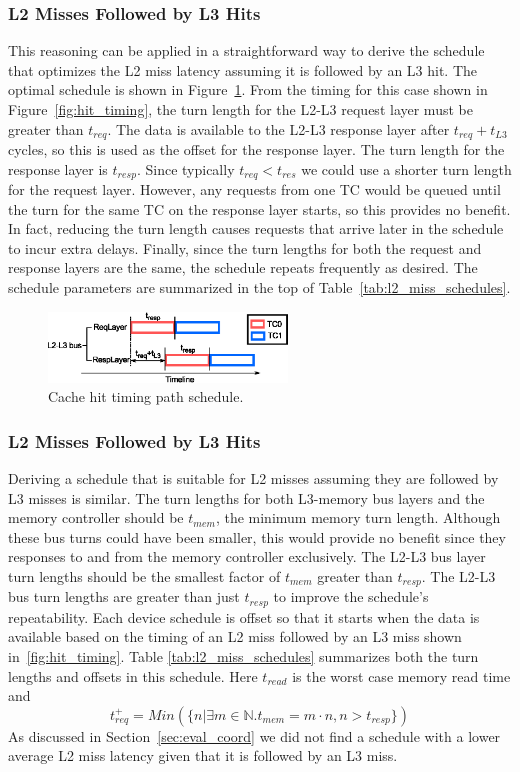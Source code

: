 \subsubsection{L2 Misses Followed by L3 Hits}
This reasoning can be applied in a straightforward way to derive the schedule 
that optimizes the L2 miss latency assuming it is followed by an L3 hit.
The optimal schedule is shown in Figure~\ref{fig:hit_schedule}.
From the timing for this case shown in Figure~\ref{fig:hit_timing}, the turn
length for the L2-L3 request layer must be greater than $t_{req}$. The 
data is available to the L2-L3 response layer after $t_{req}+t_{L3}$ cycles, so 
this is used as the offset for the response layer. The turn length for the 
response layer is $t_{resp}$. Since typically $t_{req}<t_{res}$ we could use a 
shorter turn length for the request layer. However, any requests from one TC 
would be queued until the turn for the same TC on the response layer starts, so 
this provides no benefit. In fact, reducing the turn length causes requests 
that arrive later in the schedule to incur extra delays. Finally, since the 
turn lengths for both the request and response layers are the same, the 
schedule repeats frequently as desired. The schedule parameters are summarized 
in the top of Table~\ref{tab:l2_miss_schedules}.

\begin{figure}
    \begin{center}
        \includegraphics[width=2.5in]{figs/hit_schedule.eps}
        \caption{Cache hit timing path schedule.}
        \label{fig:hit_schedule}
    \end{center}
\end{figure}

\subsubsection{L2 Misses Followed by L3 Hits}
Deriving a schedule that is suitable for L2 misses assuming they are followed 
by L3 misses is similar. The turn lengths for both L3-memory bus layers and
the memory controller should be $t_{mem}$, the minimum memory turn length.
Although these bus turns could have been smaller, this would provide no
benefit since they responses to and from the memory controller exclusively.
The L2-L3 bus layer turn lengths should be
the smallest factor of $t_{mem}$ greater than $t_{resp}$. The L2-L3 bus turn 
lengths are greater than just $t_{resp}$ to improve the schedule's repeatability.
Each device schedule is offset so that it starts when the data is available 
based on the timing of an L2 miss followed by an L3 miss shown 
in~\ref{fig:hit_timing}. Table \ref{tab:l2_miss_schedules} summarizes both the
turn lengths and offsets in this schedule. Here $t_{read}$ is the worst case
memory read time and
\[
  t_{req}^+ = Min(\{n | \exists m\in \mathbb{N}.t_{mem}=m\cdot n, n > t_{resp}\})
\]
As discussed in Section~\ref{sec:eval_coord} we did not find a schedule with 
a lower average L2 miss latency given that it is followed by an L3 miss.

